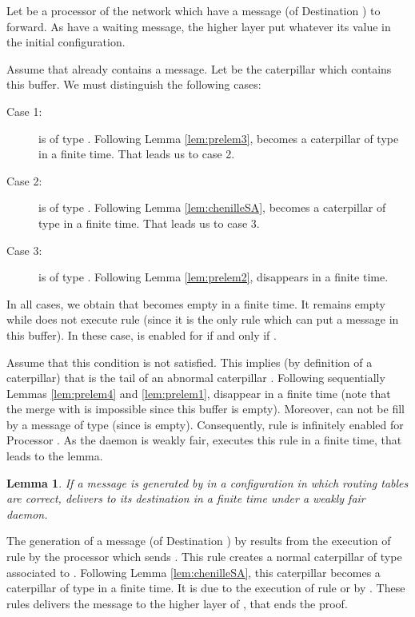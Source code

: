 \documentclass[11pt]{article}
\newtheorem{lemma}{Lemma}
\newenvironment{proof}{{\noindent\bf Proof. } }{{\hfill }}
\begin{document}
\begin{proof}
Let  be a processor of the network which have a message  (of Destination ) to forward. As  have a waiting message, the higher layer put  whatever its value in the initial configuration.

Assume that  already contains a message. Let  be the caterpillar which contains this buffer. We must distinguish the following cases:

\begin{description}
\item [Case 1:]  is of type . Following Lemma \ref{lem:prelem3},  becomes a caterpillar of type  in a finite time. That leads us to case 2.
\item [Case 2:]  is of type . Following Lemma \ref{lem:chenilleSA},  becomes a caterpillar of type  in a finite time. That leads us to case 3.
\item [Case 3:]  is of type . Following Lemma \ref{lem:prelem2},  disappears in a finite time.
\end{description}

In all cases, we obtain that  becomes empty in a finite time. It remains empty while  does not execute rule  (since it is the only rule which can put a message in this buffer). In these case,  is enabled for  if and only if . 

Assume that this condition is not satisfied. This implies (by definition of a caterpillar) that  is the tail of an abnormal caterpillar . Following sequentially Lemmas \ref{lem:prelem4} and \ref{lem:prelem1},  disappear in a finite time (note that the merge with  is impossible since this buffer is empty). Moreover,  can not be fill by a message of type  (since  is empty). Consequently, rule  is infinitely enabled for Processor . As the daemon is weakly fair,  executes this rule in a finite time, that leads to the lemma.
\end{proof}

\begin{lemma} \label{lem:transportD}
If a message  is generated by \AD in a configuration in which routing tables are correct, \AD delivers  to its destination in a finite time under a weakly fair daemon.
\end{lemma}

\begin{proof}
The generation of a message  (of Destination ) by \AD results from the execution of rule  by the processor which sends . This rule creates a normal caterpillar of type  associated to . Following Lemma \ref{lem:chenilleSA}, this caterpillar becomes a caterpillar of type  in a finite time. It is due to the execution of rule  or  by . These rules delivers the message to the higher layer of , that ends the proof.
\end{proof}
\end{document}
